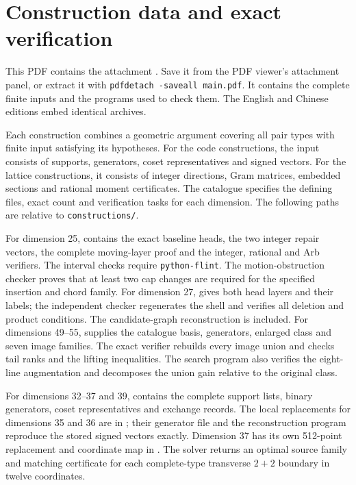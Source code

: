 \section{Construction data and exact verification}\label{app:data}

This PDF contains the attachment
.
Save it from the PDF viewer's attachment panel, or extract it with
\texttt{pdfdetach -saveall main.pdf}. It contains the complete finite
inputs and the programs used to check them. The English and Chinese
editions embed identical archives.

Each construction combines a geometric argument covering all pair types
with finite input satisfying its hypotheses. For the code constructions,
the input consists of supports, generators, coset representatives and
signed vectors. For the lattice constructions, it consists of integer
directions, Gram matrices, embedded sections and rational moment
certificates. The catalogue 
specifies the defining files, exact count and verification tasks for each
dimension. The following paths are relative to \texttt{constructions/}.

For dimension 25,  contains the exact baseline heads, the two
integer repair vectors, the complete moving-layer proof and the integer,
rational and Arb verifiers. The interval checks require \texttt{python-flint}.
The motion-obstruction checker proves that at least two cap changes
are required for the specified insertion and chord family.
For dimension 27,  gives both head layers and their labels;
the independent checker regenerates the shell and verifies all deletion
and product conditions. The candidate-graph reconstruction is included.
For dimensions 49--55,  supplies the catalogue basis,
generators, enlarged class and seven image families. The exact verifier
rebuilds every image union and checks tail ranks and the lifting inequalities.
The search program also verifies the eight-line augmentation and decomposes
the union gain relative to the original class.

For dimensions 32--37 and 39,  contains the complete
support lists, binary generators, coset representatives and exchange
records. The local replacements for dimensions 35 and 36 are in
; their generator file and the reconstruction
program reproduce the stored signed vectors exactly. Dimension 37 has
its own 512-point replacement and coordinate map in .
The solver  returns an optimal source
family and matching certificate for each complete-type transverse
$2+2$ boundary in twelve coordinates.


